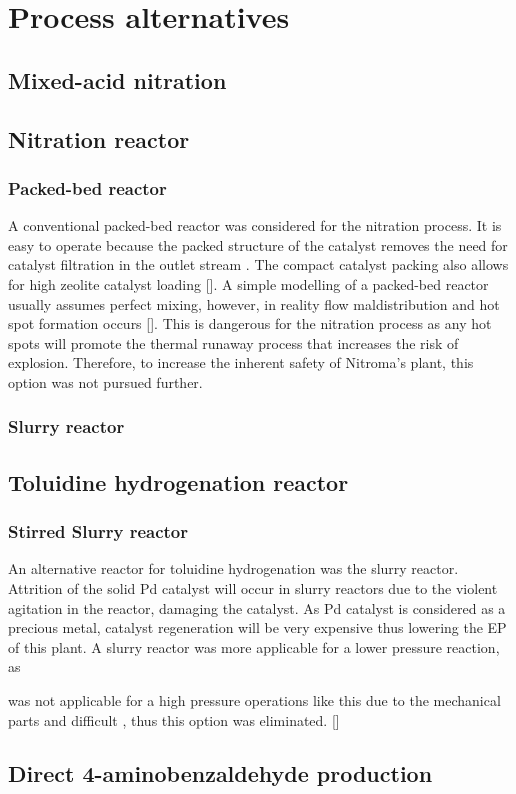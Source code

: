 \section{Process alternatives}
\label{app:alternatives}

\subsection{Mixed-acid nitration}
\label{mixed}

\subsection{Nitration reactor}
\label{nitrationreactor}
\subsubsection{Packed-bed reactor}
A conventional packed-bed reactor was considered for the nitration process. It is easy to operate because the packed structure of the catalyst removes the need for catalyst filtration in the outlet stream . The compact catalyst packing also allows for high zeolite catalyst loading []. A simple modelling of a packed-bed reactor usually assumes perfect mixing, however, in reality flow maldistribution and hot spot formation occurs []. This is dangerous for the nitration process as any hot spots will promote the thermal runaway process that increases the risk of explosion. Therefore, to increase the inherent safety of Nitroma's plant, this option was not pursued further.

\subsubsection{Slurry reactor}

\subsection{Toluidine hydrogenation reactor}
\label{toluidine}
\subsubsection{Stirred Slurry reactor}
An alternative reactor for toluidine hydrogenation was the slurry reactor. Attrition of the solid Pd catalyst will occur in slurry reactors due to the violent agitation in the reactor, damaging the catalyst. As Pd catalyst is considered as a precious metal, catalyst regeneration will be very expensive thus lowering the EP of this plant. A slurry reactor was more applicable for a lower pressure reaction, as 

was not applicable for a high pressure operations like this due to the mechanical parts and difficult
, thus this option was eliminated. []


\subsection{Direct 4-aminobenzaldehyde production}
\label{direct}
